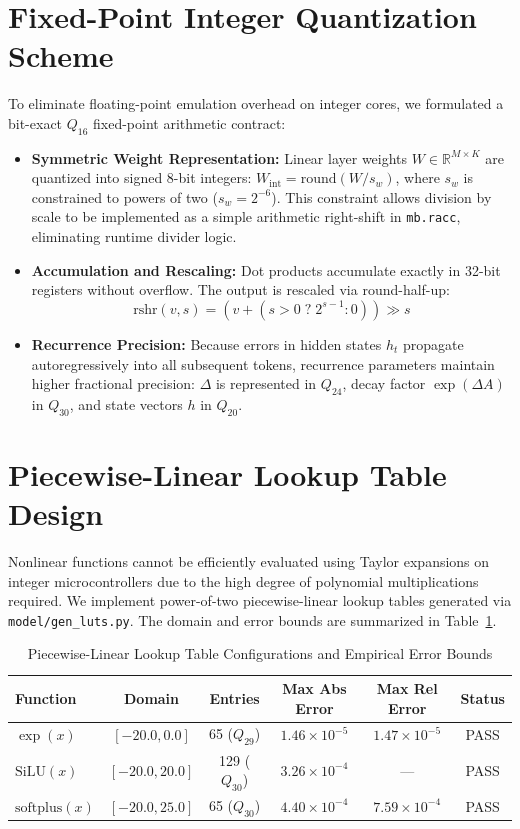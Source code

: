 \documentclass[11pt,a4paper,oneside]{report}
\begin{document}
\section{Fixed-Point Integer Quantization Scheme}
To eliminate floating-point emulation overhead on integer cores, we formulated a bit-exact $Q_{16}$ fixed-point arithmetic contract:
\begin{itemize}
    \item \textbf{Symmetric Weight Representation:} Linear layer weights $W \in \mathbb{R}^{M \times K}$ are quantized into signed 8-bit integers: $W_{\text{int}} = \text{round}(W / s_w)$, where $s_w$ is constrained to powers of two ($s_w = 2^{-6}$). This constraint allows division by scale to be implemented as a simple arithmetic right-shift in \texttt{mb.racc}, eliminating runtime divider logic.
    \item \textbf{Accumulation and Rescaling:} Dot products accumulate exactly in 32-bit registers without overflow. The output is rescaled via round-half-up:
    \begin{equation}
        \text{rshr}(v, s) = (v + (s > 0 \;?\; 2^{s-1} : 0)) \gg s
    \end{equation}
    \item \textbf{Recurrence Precision:} Because errors in hidden states $h_t$ propagate autoregressively into all subsequent tokens, recurrence parameters maintain higher fractional precision: $\Delta$ is represented in $Q_{24}$, decay factor $\exp(\Delta A)$ in $Q_{30}$, and state vectors $h$ in $Q_{20}$.
\end{itemize}

\section{Piecewise-Linear Lookup Table Design}
Nonlinear functions cannot be efficiently evaluated using Taylor expansions on integer microcontrollers due to the high degree of polynomial multiplications required. We implement power-of-two piecewise-linear lookup tables generated via \texttt{model/gen\_luts.py}. The domain and error bounds are summarized in Table~\ref{tab:lut_bounds}.

\begin{table}[!htbp]
\caption[Piecewise-Linear Lookup Table Configurations and Empirical Error Bounds]{Piecewise-Linear Lookup Table Configurations and Empirical Error Bounds}
\label{tab:lut_bounds}
\centering
\begin{tabularx}{\linewidth}{lccccc}
\toprule
\textbf{Function} & \textbf{Domain} & \textbf{Entries} & \textbf{Max Abs Error} & \textbf{Max Rel Error} & \textbf{Status} \\
\midrule
$\exp(x)$ & $[-20.0, 0.0]$ & 65 ($Q_{29}$) & $1.46 \times 10^{-5}$ & $1.47 \times 10^{-5}$ & PASS \\
$\text{SiLU}(x)$ & $[-20.0, 20.0]$ & 129 ($Q_{30}$) & $3.26 \times 10^{-4}$ & --- & PASS \\
$\text{softplus}(x)$ & $[-20.0, 25.0]$ & 65 ($Q_{30}$) & $4.40 \times 10^{-4}$ & $7.59 \times 10^{-4}$ & PASS \\
\bottomrule
\end{tabularx}
\end{table}
\end{document}
